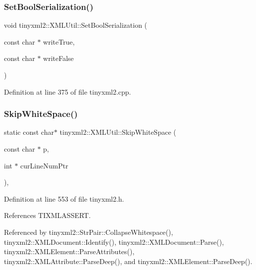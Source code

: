 \subsubsection{Set\+Bool\+Serialization()}
{\footnotesize\ttfamily void tinyxml2\+::\+X\+M\+L\+Util\+::\+Set\+Bool\+Serialization (\begin{DoxyParamCaption}\item[{const char $\ast$}]{write\+True,  }\item[{const char $\ast$}]{write\+False }\end{DoxyParamCaption})\hspace{0.3cm}{\ttfamily [static]}}



Definition at line 375 of file tinyxml2.\+cpp.

\mbox{\label{classtinyxml2_1_1_x_m_l_util_ab626a194b3523a5ba8b9dbaa2a165202}} 
\subsubsection{Skip\+White\+Space()\hspace{0.1cm}{\footnotesize\ttfamily [1/2]}}
{\footnotesize\ttfamily static const char$\ast$ tinyxml2\+::\+X\+M\+L\+Util\+::\+Skip\+White\+Space (\begin{DoxyParamCaption}\item[{const char $\ast$}]{p,  }\item[{int $\ast$}]{cur\+Line\+Num\+Ptr }\end{DoxyParamCaption})\hspace{0.3cm}{\ttfamily [inline]}, {\ttfamily [static]}}



Definition at line 553 of file tinyxml2.\+h.



References T\+I\+X\+M\+L\+A\+S\+S\+E\+RT.



Referenced by tinyxml2\+::\+Str\+Pair\+::\+Collapse\+Whitespace(), tinyxml2\+::\+X\+M\+L\+Document\+::\+Identify(), tinyxml2\+::\+X\+M\+L\+Document\+::\+Parse(), tinyxml2\+::\+X\+M\+L\+Element\+::\+Parse\+Attributes(), tinyxml2\+::\+X\+M\+L\+Attribute\+::\+Parse\+Deep(), and tinyxml2\+::\+X\+M\+L\+Element\+::\+Parse\+Deep().

\mbox{\label{classtinyxml2_1_1_x_m_l_util_abb6cb3e71f88efca82cb7157367fd91e}} 

